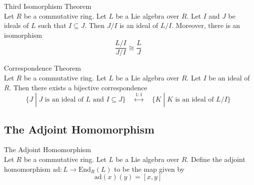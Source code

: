 \documentclass[a4paper]{article}
\begin{document}
\begin{thm}{Third Isomorphism Theorem}{}\\
Let $R$ be a commutative ring. Let $L$ be a Lie algebra over $R$. Let $I$ and $J$ be ideals of $L$ such that $I\subseteq J$. Then $J/I$ is an ideal of $L/I$. Moreover, there is an isomorphism $$\frac{L/I}{J/I}\cong\frac{L}{J}$$
\end{thm}

\begin{thm}{Correspondence Theorem}{}\\
Let $R$ be a commutative ring. Let $L$ be a Lie algebra over $R$. Let $I$ be an ideal of $R$. Then there exists a bijective correspondence $$\{J\;|\;J\text{ is an ideal of }L\text{ and }I\subseteq J\}\;\;\;\;\overset{1:1}{\longleftrightarrow}\;\;\;\;\{K\;|\;K\text{ is an ideal of }L/I\}$$
\end{thm}

\subsection{The Adjoint Homomorphism}
\begin{defn}{The Adjoint Homomorphism}{}\\
Let $R$ be a commutative ring. Let $L$ be a Lie algebra over $R$. Define the adjoint homomorphism $\text{ad}:L\to\text{End}_R(L)$ to be the map given by $$\text{ad}(x)(y)=[x,y]$$
\end{defn}
\end{document}
